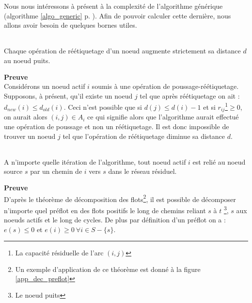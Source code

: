 Nous nous intéressons à présent à la complexité de l'algorithme générique (algorithme
\ref{algo_generic} p. \pageref{algo_generic}). Afin de pouvoir calculer cette dernière, nous allons
avoir besoin de quelques bornes utiles.

\begin{lemma} ~\\
	\label{increase_distance}
	Chaque opération de réétiquetage d'un noeud augmente strictement sa distance $d$ au noeud puits.
\end{lemma}

\textbf{Preuve} \\
Considérons un noeud actif $i$ soumis à une opération de poussage-réétiquetage. Supposons, à présent,
qu'il existe un noeud $j$ tel que après réétiquetage on ait : $d_{new}(i) \leq d_{old}(i)$. Ceci
n'est possible que si $d(j) \leq d(i) - 1$ et si $r_{ij}$\footnote{La capacité résiduelle de l'arc
$(i,j)$}$\geq 0$, on aurait alors $(i,j) \in A_i$ ce qui signifie alors que l'algorithme aurait
effectué une opération de poussage et non un réétiquetage. Il est donc impossible de trouver un
noeud $j$ tel que l'opération de réétiquetage diminue sa distance $d$.

\begin{lemma} ~\\
	\label{residual_path}
	A n'importe quelle itération de l'algorithme, tout noeud actif $i$ est relié au noeud source $s$ par un
	chemin de $i$ vers $s$ dans le réseau résiduel.
\end{lemma}

\textbf{Preuve}\\
D'après le théorème de décomposition des flots\footnote{Un exemple d'application de ce théorème est
donné à la figure \ref{app_dec_preflot}}, il est possible de décomposer n'importe quel préflot
en des flots positifs le long de chemins reliant $s$ à $t$ \footnote{Le noeud puits}, $s$ aux noeuds
actifs et le long de cycles. De plus par définition d'un préflot on a : $e(s) \leq 0$ et $e(i) \geq
0 \ \forall i \in S - \{s\}$.

